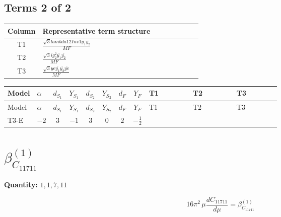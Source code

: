 \documentclass[8pt]{article}
\begin{document}
\begin{landscape}
\subsection*{Terms 2 of 2}
\begin{center}
\begin{tabular}{@{}c >{\raggedright\arraybackslash}p{0.82\linewidth}@{}}
\toprule
Column & Representative term structure \\
\midrule
T1 & \(\displaystyle \frac{\sqrt{3} lambda12Inv1 \overline{y_{1}} \overline{y_{2}}}{MF}\) \\
\midrule
T2 & \(\displaystyle \frac{\sqrt{3} i g_{2}^{2} \overline{y_{1}} \overline{y_{2}}}{MF}\) \\
\midrule
T3 & \(\displaystyle \frac{\sqrt{3} ye \overline{y_{1}} \overline{y_{2}} \overline{ye}}{MF}\) \\
\midrule
\bottomrule
\end{tabular}
\end{center}
\smallskip
\tiny
\begin{longtable}{@{}llcccccc >{\raggedright\arraybackslash}p{0.21\linewidth} >{\raggedright\arraybackslash}p{0.21\linewidth} >{\raggedright\arraybackslash}p{0.21\linewidth}@{}}
\toprule
Model & $\alpha$ & $d_{S_1}$ & $Y_{S_1}$ & $d_{S_2}$ & $Y_{S_2}$ & $d_F$ & $Y_F$ & T1 & T2 & T3 \\
\midrule
\endfirsthead
\toprule
Model & $\alpha$ & $d_{S_1}$ & $Y_{S_1}$ & $d_{S_2}$ & $Y_{S_2}$ & $d_F$ & $Y_F$ & T1 & T2 & T3 \\
\midrule
\endhead
T3-E & $-2$ & $3$ & $-1$ & $3$ & $0$ & $2$ & $-\frac{1}{2}$ & \scriptsize\adjustbox{max width=\linewidth}{$\begin{gathered} \frac{\sqrt{3} lambda12Inv1 \overline{y_{1}} \overline{y_{2}}}{6 MF}\end{gathered}$} & \scriptsize\adjustbox{max width=\linewidth}{$\begin{gathered} - \frac{\sqrt{3} i g_{2}^{2} \overline{y_{1}} \overline{y_{2}}}{6 MF}\end{gathered}$} & \scriptsize\adjustbox{max width=\linewidth}{$\begin{gathered} \frac{\sqrt{3} ye \overline{y_{1}} \overline{y_{2}} \overline{ye}}{12 MF}\end{gathered}$} \\
\midrule
\bottomrule
\end{longtable}
\clearpage
\section*{$\beta_{C_{11711}}^{(1)}$}
\noindent\textbf{Quantity: }$\mathrm{1,1,7,11}$\par\smallskip
\[16\pi^2\,\mu\frac{d C_{11711}}{d\mu}=\beta_{C_{11711}}^{(1)}\]

\end{landscape}
\end{document}
